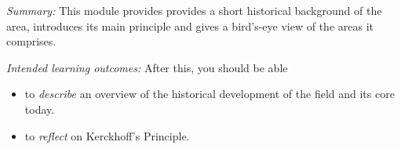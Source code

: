 \emph{Summary:}
This module provides provides a short historical background of the area, 
introduces its main principle and gives a bird's-eye view of the areas it 
comprises.

\emph{Intended learning outcomes:}
After this, you should be able
\begin{itemize}
  \item to \emph{describe} an overview of the historical development of the 
    field and its core today.
  \item to \emph{reflect} on Kerckhoff's Principle.
\end{itemize}

